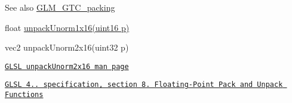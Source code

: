 \begin{DoxySeeAlso}{See also}
\hyperlink{group__gtc__packing}{G\+L\+M\+\_\+\+G\+T\+C\+\_\+packing} 

float \hyperlink{group__gtc__packing_ga7770e3ade4f4764cc1b2eb42ac4ec188}{unpack\+Unorm1x16(uint16 p)} 

vec2 unpack\+Unorm2x16(uint32 p) 

\href{http://www.opengl.org/sdk/docs/manglsl/xhtml/unpackUnorm2x16.xml}{\tt G\+L\+S\+L unpack\+Unorm2x16 man page} 

\href{http://www.opengl.org/registry/doc/GLSLangSpec.4.20.8.pdf}{\tt G\+L\+S\+L 4.. specification, section 8. Floating-\/\+Point Pack and Unpack Functions} 
\end{DoxySeeAlso}
